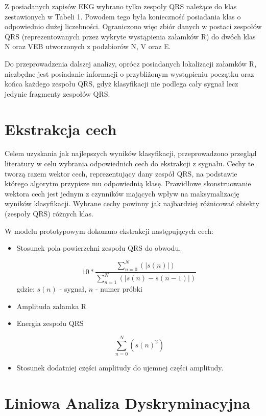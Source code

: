 \documentclass{article}
\begin{document}
Z posiadanych zapisów EKG wybrano tylko zespoły QRS należące do klas zestawionych w Tabeli 1. Powodem tego była konieczność posiadania klas o odpowiednio dużej liczebności. Ograniczono więc zbiór danych w postaci zespołów QRS (reprezentowanych przez wykryte wystąpienia załamków R) do dwóch klas N oraz VEB utworzonych z podzbiorów N, V oraz E.

Do przeprowadzenia dalszej analizy, oprócz posiadanych lokalizacji załamków R, niezbędne jest posiadanie informacji o przybliżonym wystąpieniu początku oraz końca każdego zespołu QRS, gdyż klasyfikacji nie podlega cały sygnał lecz jedynie fragmenty zespołów QRS.

\section{Ekstrakcja cech}

Celem uzyskania jak najlepszych wyników klasyfikacji, przeprowadzono przegląd literatury w celu wybrania odpowiednich cech do ekstrakcji z sygnału. Cechy te tworzą razem wektor cech, reprezentujący dany zespół QRS, na podstawie którego algorytm przypisze mu odpowiednią klasę. Prawidłowe skonstruowanie wektora cech jest jednym z czynników mających wpływ na maksymalizację wyników klasyfikacji. Wybrane cechy powinny jak najbardziej różnicować obiekty (zespoły QRS) różnych klas.

W modelu prototypowym dokonano ekstrakcji następujących cech:

\begin{itemize}
  \item Stosunek pola powierzchni zespołu QRS do obwodu.
  
 $$10*\frac{\sum_{n=0}^{N}(|s(n)|)}{\sum_{n=1}^{N}(|s(n)-s(n-1)|)}$$
 gdzie: \(s(n)\) - sygnał, \(n\) - numer próbki
  
  \item Amplituda załamka R
  \item Energia zespołu QRS

 $$\sum_{n=0}^{N}(s(n)^2)$$
  
  \item Stosunek dodatniej części amplitudy do ujemnej części amplitudy.
  
\end{itemize}



\section{Liniowa Analiza Dyskryminacyjna}
\end{document}
